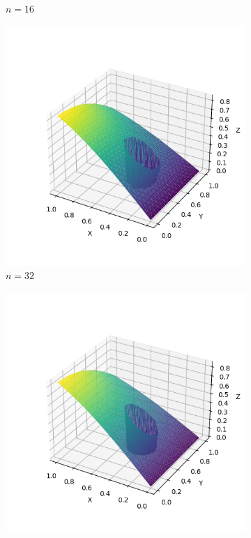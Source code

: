 \documentclass[lang=cn,a4paper,newtx,bibend=bibtex]{elegantpaper}
\begin{document}
\begin{figure}[H]
\begin{subfigure}[b]{0.18\textwidth}
      \caption{$n= 16$}
  \end{subfigure}
  \hfill
  \begin{subfigure}[b]{0.18\textwidth}
      \includegraphics[width=\textwidth]{../../res_bac/res-[data|2-Neumann-irregular-c32].png}
      \caption{$n = 32$}
  \end{subfigure}
  \hfill
  \begin{subfigure}[b]{0.18\textwidth}
      \includegraphics[width=\textwidth]{../../res_bac/res-[data|2-Neumann-irregular-d64].png}

\end{subfigure}
\end{figure}
\end{document}
